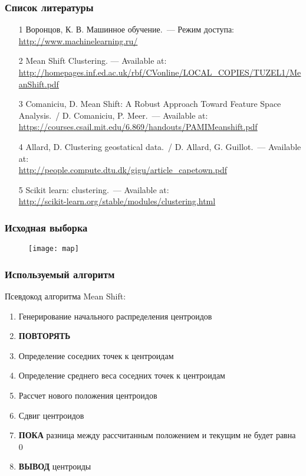 \begin{frame}
    \frametitle{Список литературы}
    \begin{enumerate}
        \scriptsize
        \item[1] Воронцов, К. В. Машинное обучение.~--- Режим доступа:\\
            \url{http://www.machinelearning.ru/}\\
        \item[2] Mean Shift Clustering. --- Available at:\\
            {\tiny\url{http://homepages.inf.ed.ac.uk/rbf/CVonline/LOCAL_COPIES/TUZEL1/MeanShift.pdf}}
        \item[3] Comaniciu, D. Mean Shift: A Robust Approach Toward Feature Space Analysis.~/
            D. Comaniciu, P. Meer.~--- Available at:\\
            \url{https://courses.csail.mit.edu/6.869/handouts/PAMIMeanshift.pdf}
        \item[4] Allard, D. Clustering geostatical data.~/
            D. Allard, G. Guillot.~--- Available at:\\
            \url{http://people.compute.dtu.dk/gigu/article_capetown.pdf}\\
        \item[5] Scikit learn: clustering.~--- Available at:\\
            \url{http://scikit-learn.org/stable/modules/clustering.html}
    \end{enumerate}
\end{frame}

\begin{frame}
    \frametitle{Исходная выборка}
    \begin{figure}
        \center
        \texttt{[image: map]}
    \end{figure}
\end{frame}

\begin{frame}
    \frametitle{Используемый алгоритм}
    Псевдокод алгоритма Mean Shift:\\
    \begin{enumerate}\itemsep -.5ex
        \item Генерирование начального распределения центроидов
        \item \textbf{ПОВТОРЯТЬ}
        \item Определение соседних точек к центроидам
        \item Определение среднего веса соседних точек к центроидам
        \item Рассчет нового положения центроидов
        \item Сдвиг центроидов
        \item \textbf{ПОКА} разница между рассчитанным положением и текущим не будет равна 0
        \item \textbf{ВЫВОД} центроиды
    \end{enumerate}
\end{frame}


